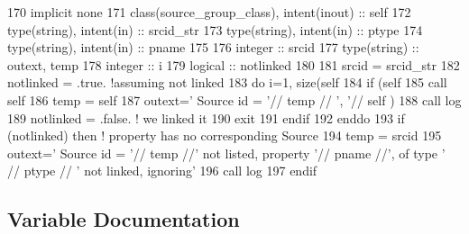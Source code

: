 \begin{DoxyCode}
170     \textcolor{keywordtype}{implicit none}
171     \textcolor{keywordtype}{class}(source\_group\_class), \textcolor{keywordtype}{intent(inout)} :: self
172     \textcolor{keywordtype}{type}(string), \textcolor{keywordtype}{intent(in)} :: srcid\_str
173     \textcolor{keywordtype}{type}(string), \textcolor{keywordtype}{intent(in)} :: ptype
174     \textcolor{keywordtype}{type}(string), \textcolor{keywordtype}{intent(in)} :: pname
175 
176     \textcolor{keywordtype}{integer} :: srcid
177     \textcolor{keywordtype}{type}(string) :: outext, temp
178     \textcolor{keywordtype}{integer} :: i
179     \textcolor{keywordtype}{logical} :: notlinked
180 
181     srcid = srcid\_str%
182     notlinked = .true.  \textcolor{comment}{!assuming not linked}
183     \textcolor{keywordflow}{do} i=1, \textcolor{keyword}{size}(self%
184         \textcolor{keywordflow}{if} (self%
185             \textcolor{keyword}{call }self%
186             temp = self%
187             outext=\textcolor{stringliteral}{'      Source id = '}// temp // \textcolor{stringliteral}{', '}// self%
      )%
188             \textcolor{keyword}{call }log%
189             notlinked = .false. \textcolor{comment}{! we linked it}
190             \textcolor{keywordflow}{exit}
191 \textcolor{keywordflow}{        endif}
192 \textcolor{keywordflow}{    enddo}
193     \textcolor{keywordflow}{if} (notlinked) \textcolor{keywordflow}{then} \textcolor{comment}{! property has no corresponding Source}
194         temp = srcid
195         outext=\textcolor{stringliteral}{'      Source id = '}// temp //\textcolor{stringliteral}{' not listed, property '}// pname //\textcolor{stringliteral}{', of type '} // ptype // \textcolor{stringliteral}{'
       not linked, ignoring'}
196         \textcolor{keyword}{call }log%
197 \textcolor{keywordflow}{    endif}
\end{DoxyCode}


\subsection{Variable Documentation}
\mbox{\label{namespacesources__mod_ab04ea8c02cdf83a1a356c8710ae811d5}} 
